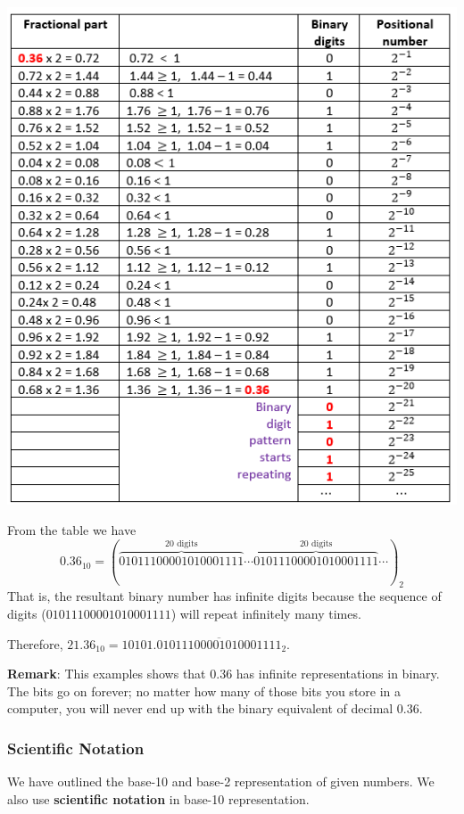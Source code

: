 \documentclass[
]{book}
\begin{document}
\begin{center}\includegraphics[width=0.95\linewidth]{img02/w02-TabularRecursiveConversionBase2Fraction} \end{center}

From the table we have \[
0.36_{10} = (\overbrace{01011100001010001111}^\text{20 digits} \cdots\overbrace{ 01011100001010001111}^\text{20 digits} \cdots)_2
\] That is, the resultant binary number has infinite digits because the sequence of digits (\(01011100001010001111\)) will repeat infinitely many times.

Therefore, \(21.36_{10} = 10101.\overline{01011100001010001111}_2\).

\textbf{Remark}: This examples shows that \(0.36\) has infinite representations in binary. The bits go on forever; no matter how many of those bits you store in a computer, you will never end up with the binary equivalent of decimal \(0.36\).

\hypertarget{scientific-notation}{%
\subsubsection{Scientific Notation}\label{scientific-notation}}

We have outlined the base-10 and base-2 representation of given numbers. We also use \textbf{scientific notation} in base-10 representation.
\end{document}
